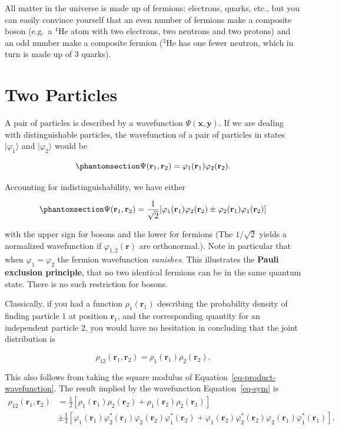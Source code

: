 \documentclass[
  a4paper,
]{scrbook}
\begin{document}
All matter in the universe is made up of fermions: electrons, quarks,
etc., but you can easily convince yourself that an even number of
fermions make a composite boson (e.g.~a \(^4\)He atom with two
electrons, two neutrons and two protons) and an odd number make a
composite fermion (\(^3\)He has one fewer neutron, which in turn is made
up of 3 quarks).

\section{Two Particles}\label{two-particles}

A pair of particles is described by a wavefunction
\(\Psi(\mathbf{x},\mathbf{y})\). If we are dealing with distinguishable
particles, the wavefunction of a pair of particles in states
\(\lvert{\varphi_1}\rangle\) and \(\lvert{\varphi_2}\rangle\) would be

\begin{equation}\phantomsection\label{eq-product-wavefunction}{
\Psi(\mathbf{r}_1,\mathbf{r}_2)=\varphi_1(\mathbf{r}_1)\varphi_2(\mathbf{r}_2).
}\end{equation}

Accounting for indistinguishability, we have either

\begin{equation}\phantomsection\label{eq-sym}{
\Psi(\mathbf{r}_1,\mathbf{r}_2)=\frac{1}{\sqrt{2}}[\varphi_1(\mathbf{r}_1)\varphi_2(\mathbf{r}_2)\pm \varphi_2(\mathbf{r}_1)\varphi_1(\mathbf{r}_2)]
}\end{equation}

with the upper sign for bosons and the lower for fermions (The
\(1/\sqrt{2}\) yields a normalized wavefunction if
\(\varphi_{1,2}(\mathbf{r})\) are orthonormal.). Note in particular that
when \(\varphi_1=\varphi_2\) the fermion wavefunction \emph{vanishes}.
This illustrates the \textbf{Pauli exclusion principle}, that no two
identical fermions can be in the same quantum state. There is no such
restriction for bosons.

Classically, if you had a function \(\rho_{1}(\mathbf{r}_1)\) describing
the probability density of finding particle \(1\) at position
\(\mathbf{r}_1\), and the corresponding quantity for an independent
particle \(2\), you would have no hesitation in concluding that the
joint distribution is

\[
\rho_{12}(\mathbf{r}_1,\mathbf{r}_2)=\rho_1(\mathbf{r}_1)\rho_2(\mathbf{r}_2).
\label{eq:classicaljoint}
\]

This also follows from taking the square modulus of
Equation~\ref{eq-product-wavefunction}. The result implied by the
wavefunction Equation~\ref{eq-sym} is \[
\begin{align}
\rho_{12}(\mathbf{r}_1,\mathbf{r}_2) &= \frac{1}{2}\left[\rho_1(\mathbf{r}_1)\rho_2(\mathbf{r}_2)+\rho_1(\mathbf{r}_2)\rho_2(\mathbf{r}_1)\right] \\
&\pm\frac{1}{2}\left[\varphi^{}_1(\mathbf{r}_1)\varphi^*_2(\mathbf{r}_1)\varphi^{}_2(\mathbf{r}_2)\varphi^*_1(\mathbf{r}_2)+\varphi^{}_1(\mathbf{r}_2)\varphi^*_2(\mathbf{r}_2)\varphi^{}_2(\mathbf{r}_1)\varphi^*_1(\mathbf{r}_1)\right].
\end{align}
\]
\end{document}
